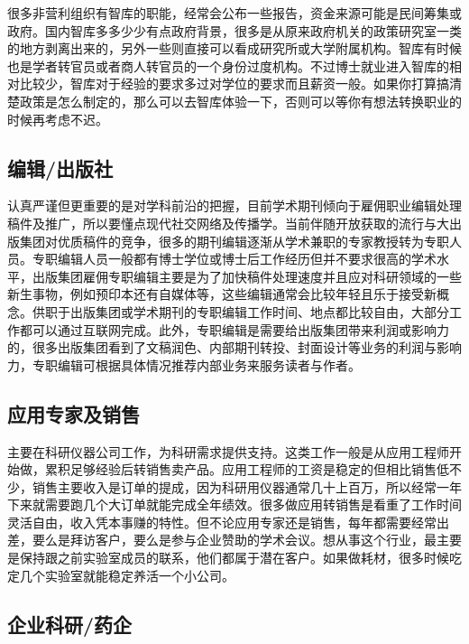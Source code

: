 \documentclass[]{tufte-book}
\begin{document}
很多非营利组织有智库的职能，经常会公布一些报告，资金来源可能是民间筹集或政府。国内智库多多少少有点政府背景，很多是从原来政府机关的政策研究室一类的地方剥离出来的，另外一些则直接可以看成研究所或大学附属机构。智库有时候也是学者转官员或者商人转官员的一个身份过度机构。不过博士就业进入智库的相对比较少，智库对于经验的要求多过对学位的要求而且薪资一般。如果你打算搞清楚政策是怎么制定的，那么可以去智库体验一下，否则可以等你有想法转换职业的时候再考虑不迟。

\hypertarget{ux7f16ux8f91ux51faux7248ux793e}{%
\subsection{编辑/出版社}\label{ux7f16ux8f91ux51faux7248ux793e}}

认真严谨但更重要的是对学科前沿的把握，目前学术期刊倾向于雇佣职业编辑处理稿件及推广，所以要懂点现代社交网络及传播学。当前伴随开放获取的流行与大出版集团对优质稿件的竞争，很多的期刊编辑逐渐从学术兼职的专家教授转为专职人员。专职编辑人员一般都有博士学位或博士后工作经历但并不要求很高的学术水平，出版集团雇佣专职编辑主要是为了加快稿件处理速度并且应对科研领域的一些新生事物，例如预印本还有自媒体等，这些编辑通常会比较年轻且乐于接受新概念。供职于出版集团或学术期刊的专职编辑工作时间、地点都比较自由，大部分工作都可以通过互联网完成。此外，专职编辑是需要给出版集团带来利润或影响力的，很多出版集团看到了文稿润色、内部期刊转投、封面设计等业务的利润与影响力，专职编辑可根据具体情况推荐内部业务来服务读者与作者。

\hypertarget{ux5e94ux7528ux4e13ux5bb6ux53caux9500ux552e}{%
\subsection{应用专家及销售}\label{ux5e94ux7528ux4e13ux5bb6ux53caux9500ux552e}}

主要在科研仪器公司工作，为科研需求提供支持。这类工作一般是从应用工程师开始做，累积足够经验后转销售卖产品。应用工程师的工资是稳定的但相比销售低不少，销售主要收入是订单的提成，因为科研用仪器通常几十上百万，所以经常一年下来就需要跑几个大订单就能完成全年绩效。很多做应用转销售是看重了工作时间灵活自由，收入凭本事赚的特性。但不论应用专家还是销售，每年都需要经常出差，要么是拜访客户，要么是参与企业赞助的学术会议。想从事这个行业，最主要是保持跟之前实验室成员的联系，他们都属于潜在客户。如果做耗材，很多时候吃定几个实验室就能稳定养活一个小公司。

\hypertarget{ux4f01ux4e1aux79d1ux7814ux836fux4f01}{%
\subsection{企业科研/药企}\label{ux4f01ux4e1aux79d1ux7814ux836fux4f01}}
\end{document}
